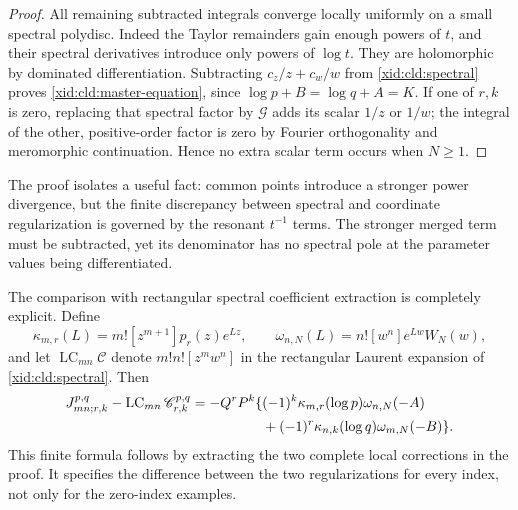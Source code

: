 \documentclass[11pt,a4paper]{article}
\numberwithin{equation}{section}
\theoremstyle{definition}
\theoremstyle{remark}
\begin{document}
\begin{proof}
All remaining subtracted integrals converge locally uniformly on a
small spectral polydisc.  Indeed the Taylor remainders gain enough
powers of $t$, and their spectral derivatives introduce only powers
of $\log t$.  They are holomorphic by dominated differentiation.
Subtracting $c_z/z+c_w/w$ from \eqref{xid:cld:spectral} proves
\eqref{xid:cld:master-equation}, since $\log p+B=\log q+A=K$.
If one of $r,k$ is zero, replacing that spectral factor by
$\mathscr G$ adds its scalar $1/z$ or $1/w$; the integral of the other,
positive-order factor is zero by Fourier orthogonality and meromorphic
continuation.  Hence no extra scalar term occurs when $N\ge1$.
\end{proof}

The proof isolates a useful fact: common points introduce a stronger
power divergence, but the finite discrepancy between spectral and
coordinate regularization is governed by the resonant $t^{-1}$ terms.
The stronger merged term must be subtracted, yet its denominator has no
spectral pole at the parameter values being differentiated.

The comparison with rectangular spectral coefficient extraction is
completely explicit.  Define
\[
 \kappa_{m,r}(L)=m![z^{m+1}]p_r(z)e^{Lz},\qquad
 \omega_{n,N}(L)=n![w^n]e^{Lw}W_N(w),
\]
and let $\operatorname{LC}_{mn}\mathscr C$ denote
$m!n![z^mw^n]$ in the rectangular Laurent expansion of
\eqref{xid:cld:spectral}.  Then
\begin{align}
 J_{mn;r,k}^{p,q}-\operatorname{LC}_{mn}\mathscr C_{r,k}^{p,q}
 =-Q^rP^k\{&(-1)^k\kappa_{m,r}(\log p)\omega_{n,N}(-A)\notag\\
           &+(-1)^r\kappa_{n,k}(\log q)\omega_{m,N}(-B)\}.
 \label{xid:cld:spectral-contact-difference}
\end{align}
This finite formula follows by extracting the two complete local
corrections in the proof.  It specifies the difference between the two
regularizations for every index, not only for the zero-index examples.
\end{document}
